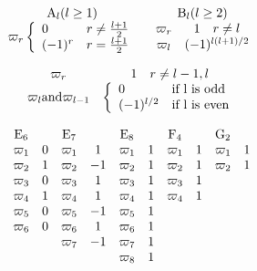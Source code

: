 \[
\begin{array}{c c} \mathrm{A} _ {l} (l \geq 1) & \mathrm{B} _ {l} (l \geq 2) \\ \varpi_ {r} \left\{ \begin{array}{l l} 0 & r \neq \frac {l + 1}{2} \\ (- 1) ^ {r} & r = \frac {l + 1}{2} \end{array} \right. & \begin{array}{c c} \varpi_ {r} & 1 \quad r \neq l \\ \varpi_ {l} & (- 1) ^ {l (l + 1) / 2} \end{array} \end{array}
\]

\[
\begin{array}{c c} \varpi_ {r} & 1 \quad r \neq l - 1, l \\ \varpi_ {l} \text {and} \varpi_ {l - 1} & \left\{ \begin{array}{l l} 0 & \text {if l is odd} \\ (- 1) ^ {l / 2} & \text {if l is even} \end{array} \right. \end{array}
\]

\[
\begin{array}{c c c c c c c c c c} \mathrm{E} _ {6} & & \mathrm{E} _ {7} & & \mathrm{E} _ {8} & & \mathrm{F} _ {4} & & \mathrm{G} _ {2} \\ \varpi_ {1} & 0 & \varpi_ {1} & 1 & \varpi_ {1} & 1 & \varpi_ {1} & 1 & \varpi_ {1} & 1 \\ \varpi_ {2} & 1 & \varpi_ {2} & - 1 & \varpi_ {2} & 1 & \varpi_ {2} & 1 & \varpi_ {2} & 1 \\ \varpi_ {3} & 0 & \varpi_ {3} & 1 & \varpi_ {3} & 1 & \varpi_ {3} & 1 \\ \varpi_ {4} & 1 & \varpi_ {4} & 1 & \varpi_ {4} & 1 & \varpi_ {4} & 1 \\ \varpi_ {5} & 0 & \varpi_ {5} & - 1 & \varpi_ {5} & 1 \\ \varpi_ {6} & 0 & \varpi_ {6} & 1 & \varpi_ {6} & 1 \\ & & \varpi_ {7} & - 1 & \varpi_ {7} & 1 \\ & & & & \varpi_ {8} & 1 \end{array}
\]